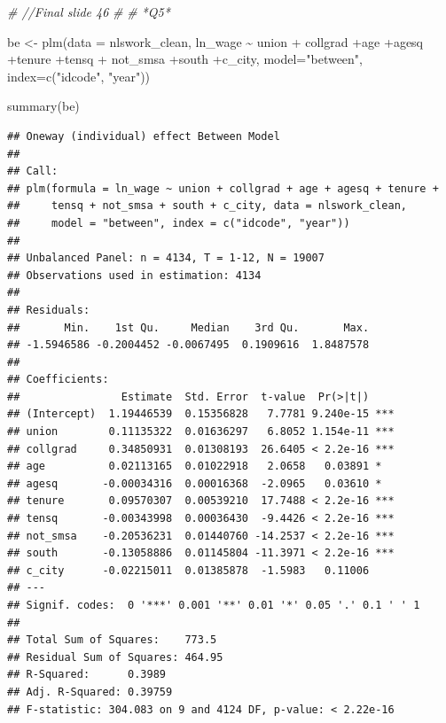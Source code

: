 \documentclass[
]{article}
\newenvironment{Shaded}{\begin{snugshade}}{\end{snugshade}}
\newcommand{\AttributeTok}[1]{\textcolor[rgb]{0.77,0.63,0.00}{#1}}
\newcommand{\CommentTok}[1]{\textcolor[rgb]{0.56,0.35,0.01}{\textit{#1}}}
\newcommand{\FunctionTok}[1]{\textcolor[rgb]{0.00,0.00,0.00}{#1}}
\newcommand{\NormalTok}[1]{#1}
\newcommand{\OtherTok}[1]{\textcolor[rgb]{0.56,0.35,0.01}{#1}}
\newcommand{\SpecialCharTok}[1]{\textcolor[rgb]{0.00,0.00,0.00}{#1}}
\newcommand{\StringTok}[1]{\textcolor[rgb]{0.31,0.60,0.02}{#1}}
\begin{document}
\begin{Shaded}
\begin{Highlighting}[]
\CommentTok{\#   //Final slide 46}
\CommentTok{\# }
\CommentTok{\# *Q5*}

\NormalTok{  be }\OtherTok{\textless{}{-}} \FunctionTok{plm}\NormalTok{(}\AttributeTok{data =}\NormalTok{ nlswork\_clean, ln\_wage }\SpecialCharTok{\textasciitilde{}}\NormalTok{ union }\SpecialCharTok{+}
\NormalTok{              collgrad }\SpecialCharTok{+}\NormalTok{age }\SpecialCharTok{+}\NormalTok{agesq }\SpecialCharTok{+}\NormalTok{tenure }\SpecialCharTok{+}\NormalTok{tensq }\SpecialCharTok{+}
\NormalTok{              not\_smsa }\SpecialCharTok{+}\NormalTok{south }\SpecialCharTok{+}\NormalTok{c\_city, }\AttributeTok{model=}\StringTok{"between"}\NormalTok{,}
            \AttributeTok{index=}\FunctionTok{c}\NormalTok{(}\StringTok{"idcode"}\NormalTok{, }\StringTok{"year"}\NormalTok{))}
  
      \FunctionTok{summary}\NormalTok{(be)}
\end{Highlighting}
\end{Shaded}

\begin{verbatim}
## Oneway (individual) effect Between Model
## 
## Call:
## plm(formula = ln_wage ~ union + collgrad + age + agesq + tenure + 
##     tensq + not_smsa + south + c_city, data = nlswork_clean, 
##     model = "between", index = c("idcode", "year"))
## 
## Unbalanced Panel: n = 4134, T = 1-12, N = 19007
## Observations used in estimation: 4134
## 
## Residuals:
##       Min.    1st Qu.     Median    3rd Qu.       Max. 
## -1.5946586 -0.2004452 -0.0067495  0.1909616  1.8487578 
## 
## Coefficients:
##                Estimate  Std. Error  t-value  Pr(>|t|)    
## (Intercept)  1.19446539  0.15356828   7.7781 9.240e-15 ***
## union        0.11135322  0.01636297   6.8052 1.154e-11 ***
## collgrad     0.34850931  0.01308193  26.6405 < 2.2e-16 ***
## age          0.02113165  0.01022918   2.0658   0.03891 *  
## agesq       -0.00034316  0.00016368  -2.0965   0.03610 *  
## tenure       0.09570307  0.00539210  17.7488 < 2.2e-16 ***
## tensq       -0.00343998  0.00036430  -9.4426 < 2.2e-16 ***
## not_smsa    -0.20536231  0.01440760 -14.2537 < 2.2e-16 ***
## south       -0.13058886  0.01145804 -11.3971 < 2.2e-16 ***
## c_city      -0.02215011  0.01385878  -1.5983   0.11006    
## ---
## Signif. codes:  0 '***' 0.001 '**' 0.01 '*' 0.05 '.' 0.1 ' ' 1
## 
## Total Sum of Squares:    773.5
## Residual Sum of Squares: 464.95
## R-Squared:      0.3989
## Adj. R-Squared: 0.39759
## F-statistic: 304.083 on 9 and 4124 DF, p-value: < 2.22e-16
\end{verbatim}
\end{document}
